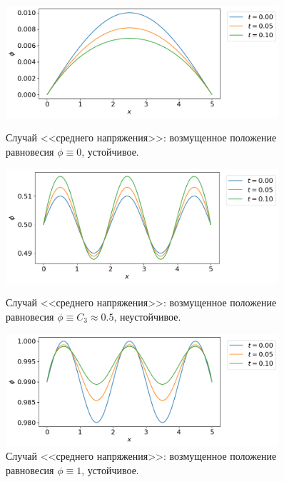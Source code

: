 \begin{figure}[!tp]
    \centering
    \includegraphics[width=0.9\textwidth]{figures/equilibrium_2_0.png}
    \vspace{-0.3cm}
    \caption{Случай <<среднего напряжения>>: возмущенное положение равновесия $\phi \equiv 0$, устойчивое.}
    \label{fig:equilibrium_2_0}
    \vspace{0.5cm}

    \includegraphics[width=0.9\textwidth]{figures/equilibrium_2_05.png}
    \vspace{-0.3cm}
    \caption{Случай <<среднего напряжения>>: возмущенное положение равновесия $\phi \equiv C_3 \approx 0.5$, неустойчивое.}
    \label{fig:equilibrium_2_05}
    \vspace{0.5cm}
    
    \includegraphics[width=0.9\textwidth]{figures/equilibrium_2_1.png}
    \vspace{-0.3cm}
    \caption{Случай <<среднего напряжения>>: возмущенное положение равновесия $\phi \equiv 1$, устойчивое.}
    \label{fig:equilibrium_2_1}
\end{figure}

